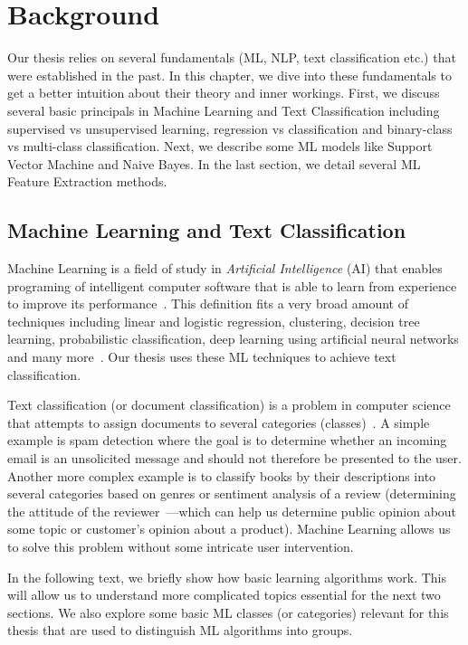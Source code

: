 \chapter{Background}
\label{chapter:background}

Our thesis relies on several fundamentals (ML, NLP, text classification etc.) that were established in the past. In this chapter, we dive into these fundamentals to get a better intuition about their theory and inner workings. First, we discuss several basic principals in Machine Learning and Text Classification including supervised vs unsupervised learning, regression vs classification and binary-class vs multi-class classification. Next, we describe some ML models like Support Vector Machine and Naive Bayes. In the last section, we detail several ML Feature Extraction methods.

\section{Machine Learning and Text Classification}

Machine Learning is a field of study in \textit{Artificial Intelligence} (AI) that enables programing of intelligent computer software that is able to learn from experience to improve its performance~\cite{Samuel1959}. This definition fits a very broad amount of techniques including linear and logistic regression, clustering, decision tree learning, probabilistic classification, deep learning using artificial neural networks and many more~\cite{bishop2006pattern}. Our thesis uses these ML techniques to achieve text classification.

Text classification (or document classification) is a problem in computer science that attempts to assign documents to several categories (classes)~\cite{Anvik2006}. A simple example is spam detection where the goal is to determine whether an incoming email is an unsolicited message and should not therefore be presented to the user. Another more complex example is to classify books by their descriptions into several categories based on genres or sentiment analysis of a review (determining the attitude of the reviewer~\cite{pang2008sentiment}---which can help us determine public opinion about some topic or customer's opinion about a product). Machine Learning allows us to solve this problem without some intricate user intervention.

In the following text, we briefly show how basic learning algorithms work. This will allow us to understand more complicated topics essential for the next two sections. We also explore some basic ML classes (or categories) relevant for this thesis that are used to distinguish ML algorithms into groups.

